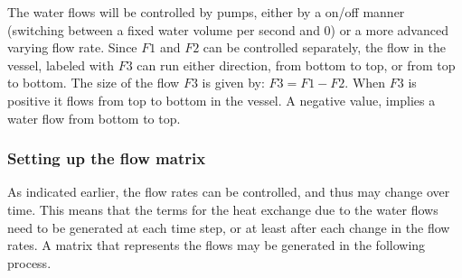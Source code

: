 The water flows will be controlled by pumps, either by a on/off manner (switching between a fixed water volume per second and 0) or a more advanced varying flow rate. 
Since $F1$ and $F2$ can be controlled separately, the flow in the vessel, labeled with $F3$ can run either direction, from bottom to top, or from top to bottom. The size of the flow $F3$ is given by: $F3 = F1 - F2$. When $F3$ is positive it flows from top to bottom in the vessel. A negative value, implies a water flow from bottom to top. 


\subsubsection{Setting up the flow matrix}\label{s:flow_matrices}
As indicated earlier, the flow rates can be controlled, and thus may change over time. This means that the terms for the heat exchange due to the water flows need to be generated at each time step, or at least after each change in the flow rates. A matrix that represents the flows may be generated in the following process.

